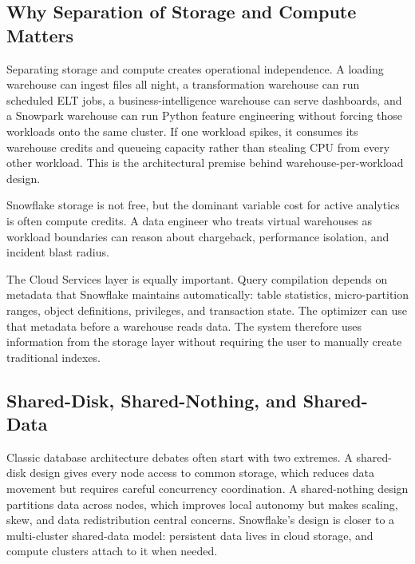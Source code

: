 \subsection{Why Separation of Storage and Compute Matters}
Separating storage and compute creates operational independence. A loading warehouse can ingest files all night, a transformation warehouse can run scheduled ELT jobs, a business-intelligence warehouse can serve dashboards, and a Snowpark warehouse can run Python feature engineering without forcing those workloads onto the same cluster. If one workload spikes, it consumes its warehouse credits and queueing capacity rather than stealing CPU from every other workload. This is the architectural premise behind warehouse-per-workload design.

\begin{notebox}
Snowflake storage is not free, but the dominant variable cost for active analytics is often compute credits. A data engineer who treats virtual warehouses as workload boundaries can reason about chargeback, performance isolation, and incident blast radius.
\end{notebox}

The Cloud Services layer is equally important. Query compilation depends on metadata that Snowflake maintains automatically: table statistics, micro-partition ranges, object definitions, privileges, and transaction state. The optimizer can use that metadata before a warehouse reads data. The system therefore uses information from the storage layer without requiring the user to manually create traditional indexes.

\subsection{Shared-Disk, Shared-Nothing, and Shared-Data}
Classic database architecture debates often start with two extremes. A shared-disk design gives every node access to common storage, which reduces data movement but requires careful concurrency coordination. A shared-nothing design partitions data across nodes, which improves local autonomy but makes scaling, skew, and data redistribution central concerns. Snowflake's design is closer to a multi-cluster shared-data model: persistent data lives in cloud storage, and compute clusters attach to it when needed.

